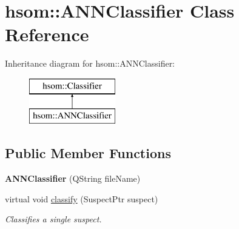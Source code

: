 \hypertarget{classhsom_1_1_a_n_n_classifier}{\section{hsom\-:\-:\-A\-N\-N\-Classifier \-Class \-Reference}
\label{classhsom_1_1_a_n_n_classifier}
}
\-Inheritance diagram for hsom\-:\-:\-A\-N\-N\-Classifier\-:\begin{figure}[H]
\begin{center}
\leavevmode
\includegraphics[height=2.000000cm]{classhsom_1_1_a_n_n_classifier}
\end{center}
\end{figure}
\subsection*{\-Public \-Member \-Functions}
\begin{DoxyCompactItemize}
\item 
\hypertarget{classhsom_1_1_a_n_n_classifier_a1af6ffad791c85dd9629131c5c5020f9}{{\bfseries \-A\-N\-N\-Classifier} (\-Q\-String file\-Name)}\label{classhsom_1_1_a_n_n_classifier_a1af6ffad791c85dd9629131c5c5020f9}

\item 
virtual void \hyperlink{classhsom_1_1_a_n_n_classifier_a2777506e21fc1fcb2900ede529aaefac}{classify} (\-Suspect\-Ptr suspect)
\begin{DoxyCompactList}\small\item\em \-Classifies a single suspect. \end{DoxyCompactList}\end{DoxyCompactItemize}
